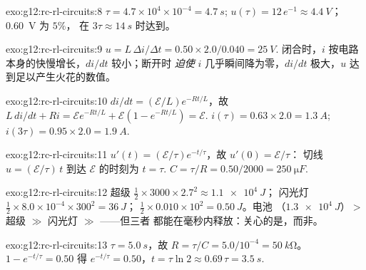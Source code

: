 \begin{solution}{exo:g12:rc-rl-circuits:8}
$\tau = 4.7\times10^{4} \times 10^{-4} = \qty{4.7}{s}$;
$u(\tau) = 12\,e^{-1} \approx \qty{4.4}{V}$；\qty{0.60}{V} 为 $5\%$，
在 $3\tau \approx \qty{14}{s}$ 时达到。
\end{solution}

\begin{solution}{exo:g12:rc-rl-circuits:9}
$u = L\,\Delta i/\Delta t = 0.50 \times 2.0/0.040 = \qty{25}{V}$.
闭合时，$i$ 按电路本身的快慢增长，$di/dt$ 较小；断开时
\emph{迫使} $i$ 几乎瞬间降为零，$di/dt$ 极大，$u$
达到足以产生火花的数值。
\end{solution}

\begin{solution}{exo:g12:rc-rl-circuits:10}
$di/dt = (\mathcal{E}/L)e^{-Rt/L}$，故 $L\,di/dt + Ri =
\mathcal{E}e^{-Rt/L} + \mathcal{E}(1 - e^{-Rt/L}) = \mathcal{E}$.
$i(\tau) = 0.63 \times 2.0 = \qty{1.3}{A}$;
$i(3\tau) = 0.95 \times 2.0 = \qty{1.9}{A}$.
\end{solution}

\begin{solution}{exo:g12:rc-rl-circuits:11}
$u'(t) = (\mathcal{E}/\tau)e^{-t/\tau}$，故 $u'(0) = \mathcal{E}/\tau$：
切线 $u = (\mathcal{E}/\tau)\,t$ 到达 $\mathcal{E}$ 的时刻为
$t = \tau$. $C = \tau/R = 0.50/2000 = \qty{250}{\micro F}$.
\end{solution}

\begin{solution}{exo:g12:rc-rl-circuits:12}
超级 $\tfrac12 \times 3000 \times 2.7^2 \approx \qty{1.1e4}{J}$；
闪光灯 $\tfrac12 \times 8.0\times10^{-4} \times 300^2 = \qty{36}{J}$；
 $\tfrac12 \times 0.010 \times 10^2 = \qty{0.50}{J}$。电池
（$\qty{1.3e4}{J}$）$>$ 超级 $\gg$ 闪光灯 $\gg$ ——但三者
都能在毫秒内释放：关心的是，而非。
\end{solution}

\begin{solution}{exo:g12:rc-rl-circuits:13}
$\tau = \qty{5.0}{s}$，故 $R = \tau/C = 5.0/10^{-4} = \qty{50}{k\ohm}$。
$1 - e^{-t/\tau} = 0.50$ 得 $e^{-t/\tau} = 0.50$，$t = \tau\ln 2
\approx 0.69\,\tau = \qty{3.5}{s}$.
\end{solution}

